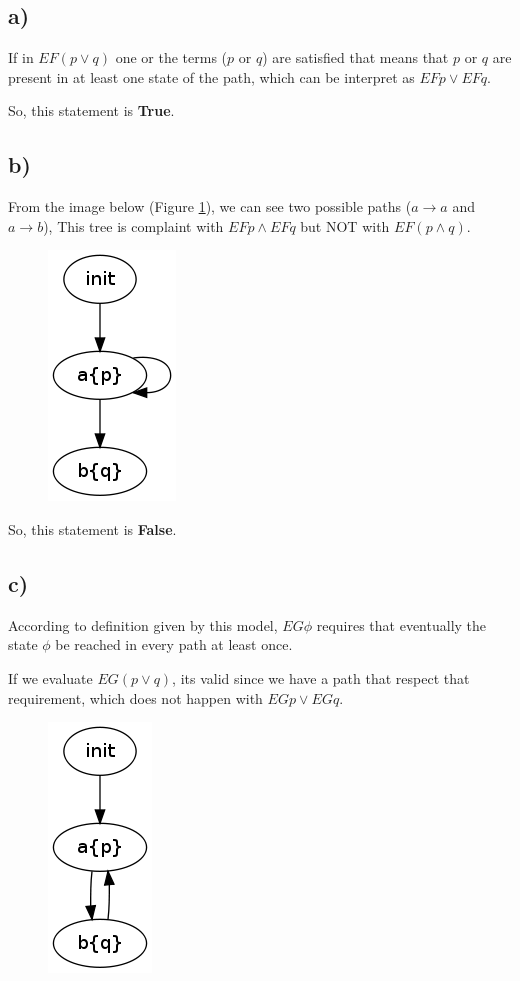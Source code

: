 \documentclass[a4paper]{article}
\begin{document}
\subsection*{a)}

If in $EF ( p \lor q ) $ one or the terms ($p$ or $q$) are satisfied that means that $p$ or $q$ are present in at least one state of the path, which can be interpret as $EF p \lor EF q$.

So, this statement is \textbf{True}.

\subsection*{b)}

From the image below (Figure \ref{fig:3b}), we can see two possible paths ($a \to a$ and $a \to b$), This tree is complaint with $EF p \land EF q$ but NOT with $EF ( p \land q )$.

\begin{figure}[h]
		\centering
		\includegraphics[scale=0.50]{img/3b}
		\label{fig:3b}
\end{figure}

So, this statement is \textbf{False}.

\subsection*{c)}

According to definition given by this model, $EG \phi $ requires that eventually the state $\phi$ be reached in every path at least once. 

If we evaluate $EG (p \lor q)$, its valid since we have a path that respect that requirement, which does not happen with 
$EG p \lor EG q$.

\begin{figure}[h]
		\centering
		\includegraphics[scale=0.50]{img/3c}
		\label{fig:3c}
\end{figure}
\end{document}
